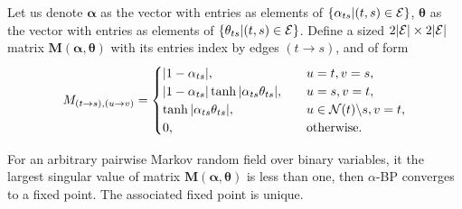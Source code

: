\documentclass[conference,onecolumn]{IEEEtran}
\begin{document}
Let us denote $\bm{\alpha}$ as the vector with entries as elements of $\left\{ \alpha_{ts} | (t ,s) \in \mathcal{E} \right\}$,  $\bm{\theta}$ as the vector with entries as elements of $\left\{ \theta_{ts} | (t ,s) \in \mathcal{E} \right\}$. Define a sized $2| \mathcal{E} | \times 2| \mathcal{E} |$ matrix $\bm{M}(\bm{\alpha}, \bm{\theta})$ with its entries index by edges $(t\rightarrow s)$, and of form
\begin{equation}
  M_{(t\rightarrow s), (u \rightarrow v)} =
  \begin{cases}
    |  1 - \alpha_{ts} |, &\quad u=t, v=s, \\
    |  1 - \alpha_{ts} | \tanh | \alpha_{ts} \theta_{ts} |, & \quad u = s, v =t, \\
    \tanh| \alpha_{ts} \theta_{ts} |, & \quad u \in \mathcal{N}(t)\backslash s, v = t, \\
    0, & \quad \mathrm{otherwise}.
  \end{cases}
\end{equation}
\begin{thm}\label{thm:normd}
  For an arbitrary pairwise Markov random field over binary variables,
  it the largest singular value of matrix $\bm{M}(\bm{\alpha}, \bm{\theta})$ is less than one,
  then $\alpha$-BP converges to a fixed point. The associated fixed
  point is unique.
\end{thm}
\end{document}
